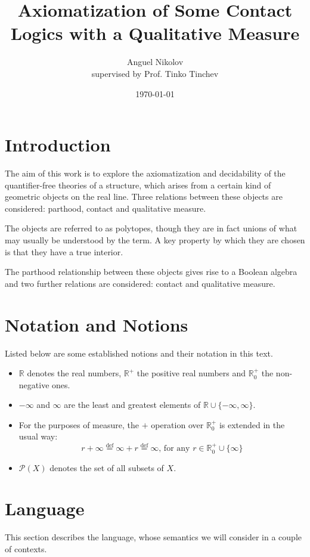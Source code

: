 \documentclass{article}
\title{Axiomatization of Some Contact Logics with a Qualitative Measure}
\author{Anguel Nikolov\\{\small supervised by Prof. Tinko Tinchev}}
\affil{Faculty of Mathematics and Informatics \\
  Sofia University ``St. Kliment Ohridski''}
\date{\today}
\newcommand{\R}{\mathbb{R}}
\newcommand{\pwrset}{\mathcal{P}}
\newcommand{\eqdef}{\stackrel{\text{def}}{=}}
\begin{document}
\maketitle

\section{Introduction}

The aim of this work is to explore the axiomatization and decidability of the quantifier-free theories of a structure, which arises from a certain kind of geometric objects on the real line. Three relations between these objects are considered: parthood, contact and qualitative measure.

The objects are referred to as polytopes, though they are in fact unions of what may usually be understood by the term. A key property by which they are chosen is that they have a true interior.

The parthood relationship between these objects gives rise to a Boolean algebra and two further relations are considered: contact and qualitative measure.
\section{Notation and Notions}
Listed below are some established notions and their notation in this text.
\begin{itemize}
\item $\R$ denotes the real numbers, $\R^+$ the positive real numbers and $\R^+_0$ the non-negative ones.
\item $-\infty$ and $\infty$ are the least and greatest elements of $\R \cup \{-\infty, \infty\}$.
\item For the purposes of measure, the $+$ operation over $\R^+_0$ is extended in the usual way:
  \begin{equation*}
    r + \infty \eqdef \infty + r \eqdef \infty \text{, for any } r \in \R^+_0 \cup \{\infty\}
  \end{equation*}
\item $\pwrset(X)$ denotes the set of all subsets of $X$.
\end{itemize}
\section{Language}
This section describes the language, whose semantics we will consider in a couple of contexts.
\end{document}
